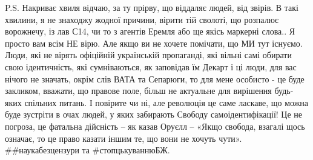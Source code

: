 P.S. Накриває хвиля відчаю, за ту прірву, що віддаляє людей, від звірів. В такі
хвилини, я не знаходжу жодної причини, вірити тій сволоті, що розпалює
ворожнечу, із лав С14, чи то з агентів Еремля або ще якісь маркерні слова.. Я
просто вам всім НЕ вірю. Але якщо ви не хочете помічати, що МИ тут існуємо.
Люди, які не вірять офіційній українській пропаганді, які вільні самі обирати
свою ідентичність, які сумніваються, як заповідав їм Декарт і ці люди, для вас
нічого не значать, окрім слів ВАТА та Сепарюги, то для мене особисто - це буде
закликом, вважати, що правове поле, більш не актуальне для вирішення будь-яких
спільних питань. І повірите чи ні, але революція це саме ласкаве, що можна буде
зустріти в очах людей, у яких забирають Свободу самоідентифікації! Це не
погроза, це фатальна дійсність – як казав Оруєлл – «Якщо свобода, взагалі щось
означає, то це право казати іншим те, що вони не хочуть чути».
##наукабезцензури та #стопцькуваннюБЖ.
